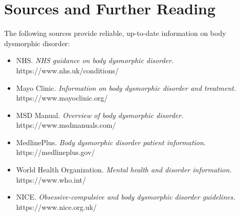 \section*{Sources and Further Reading}
The following sources provide reliable, up-to-date information on body dysmorphic disorder:

\begin{itemize}
    \item NHS. \textit{NHS guidance on body dysmorphic disorder.} https://www.nhs.uk/conditions/
    \item Mayo Clinic. \textit{Information on body dysmorphic disorder and treatment.} https://www.mayoclinic.org/
    \item MSD Manual. \textit{Overview of body dysmorphic disorder.} https://www.msdmanuals.com/
    \item MedlinePlus. \textit{Body dysmorphic disorder patient information.} https://medlineplus.gov/
    \item World Health Organization. \textit{Mental health and disorder information.} https://www.who.int/
    \item NICE. \textit{Obsessive-compulsive and body dysmorphic disorder guidelines.} https://www.nice.org.uk/
\end{itemize}
